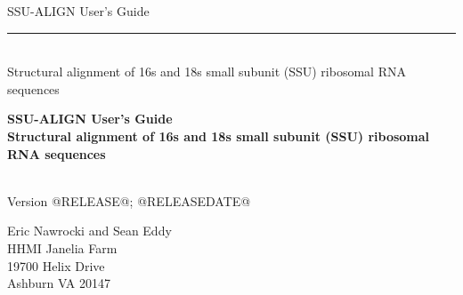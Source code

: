 \begin{titlepage}
{\Large

\vspace*{\fill}

\begin{latexonly}
\noindent
{\Huge \textsf{SSU-ALIGN User's Guide}} \\ 
\rule[2pt]{\textwidth}{1pt} \\
\hspace*{\fill} {\large \textsf{Structural alignment of 16s and 18s small subunit
    (SSU) ribosomal RNA sequences}\\}
\end{latexonly}

\begin{htmlonly}
\begin{center}
{\Huge \textbf{SSU-ALIGN User's Guide}}\\
{\large \textbf{Structural alignment of 16s and 18s small subunit
    (SSU) ribosomal RNA sequences}}\\
\end{center}
\end{htmlonly}

\vspace*{\fill}

\begin{center}
\textsl{}\\
Version @RELEASE@; @RELEASEDATE@ \\ 

\vspace*{\fill}

Eric Nawrocki and Sean Eddy\\
HHMI Janelia Farm\\
19700 Helix Drive\\
Ashburn VA 20147\\
\textsl{} \\
\end{center}

\vspace*{\fill}

}
\end{titlepage}

